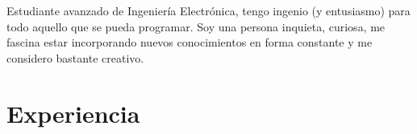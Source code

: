 \documentclass[11pt,a4paper,roman]{moderncv}        %
\makeatletter
\let\oldmakecvtitle\makecvtitle
\renewcommand*{\makecvtitle}{%
		{\centering\framebox{\texttt{[image: \\@photo]}}\par\vspace{10pt}}%
		\oldmakecvtitle%
	}%
\makeatother
\begin{document}
	\makecvtitle
	
	\small{Estudiante avanzado de Ingeniería Electrónica, tengo ingenio (y entusiasmo) para todo aquello que se pueda programar. Soy una persona inquieta, curiosa, me fascina estar incorporando nuevos conocimientos en forma constante y me considero bastante creativo.}
	
	\section{Experiencia}
	
	\vspace{6pt}
	
\end{document}
